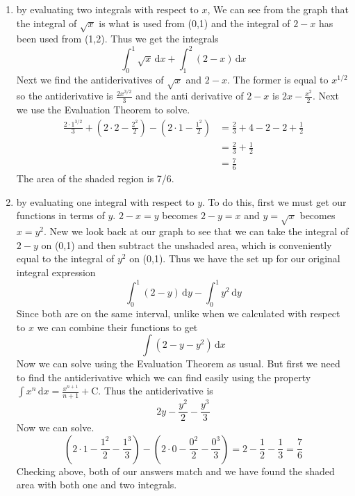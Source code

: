 \documentclass{article}
\begin{document}
\begin{enumerate}[label=\textbf{(1.\arabic*)}]
\begin{enumerate}[label=\textbf{(\alph*)}]
\item by evaluating two integrals with respect to $x$, %
We can see from the graph that the integral of $\sqrt{x}$ is what is used from (0,1) and the integral of $2-x$ has been used from (1,2). Thus we get the integrals
\[\int_0^1\!\sqrt{x}\,\text{d}x+\int_1^2\!(2-x)\,\text{d}x\]
Next we find the antiderivatives of $\sqrt{x}$ and $2-x$. The former is equal to $x^{1/2}$ so the antiderivative is $\frac{2 {x}^{3/2}}{3}$ and the anti derivative of $2-x$ is $2x-\frac{x^2}{2}$. Next we use the Evaluation Theorem to solve.
\begin{align*}
\frac{2\cdot1^{3/2}}{3}+\left(2\cdot2-\frac{2^2}{2}\right)-\left(2\cdot1-\frac{1^2}{2}\right)&=\frac{2}{3}+4-2-2+\frac{1}{2}\\&=\frac{2}{3}+\frac{1}{2}\\&=\frac{7}{6}
\end{align*}
The area of the shaded region is 7/6.

\item by evaluating one integral with respect to $y$. %
To do this, first we must get our functions in terms of $y$. $2-x=y$ becomes $2-y=x$ and $y=\sqrt{x}$ becomes $x=y^2$. New we look back at our graph to see that we can take the integral of $2-y$ on (0,1) and then subtract the unshaded area, which is conveniently equal to the integral of $y^2$ on (0,1). Thus we have the set up for our original integral expression
\[ \int_0^1 \! (2-y)\,\text{d}y-\int_0^1\!y^2\,\text{d}y\]
Since both are on the same interval, unlike when we calculated with respect to $x$ we can combine their functions to get
\[\int\!(2-y-y^2)\,\text{d}x\]
Now we can solve using the Evaluation Theorem as usual. But first we need to find the antiderivative which we can find easily using the property $\int\!x^n\,\text{d}x=\frac{x^{n+1}}{n+1}+\text{C}$. Thus the antiderivative is
\[2y-\frac{y^2}{2}-\frac{y^3}{3}\]
Now we can solve.
\[\left(2\cdot1-\frac{1^2}{2}-\frac{1^3}{3}\right)-\left(2\cdot0-\frac{0^2}{2}-\frac{0^3}{3}\right)=2-\frac{1}{2}-\frac{1}{3}=\frac{7}{6}\]
Checking above, both of our answers match and we have found the shaded area with both one and two integrals.
\end{enumerate}

\newpage %


\end{enumerate}
\end{document}
